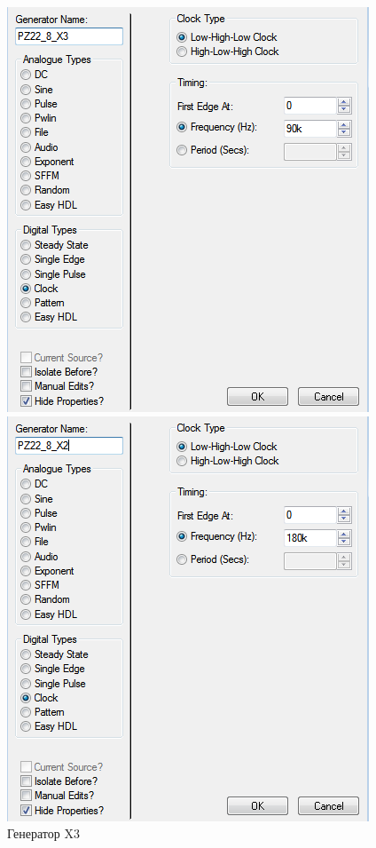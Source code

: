 \documentclass{article}
\begin{document}
\begin{normalsize}
\begin{figure}[H]
\begin{minipage}[h]{0.47\linewidth}
\begin{center}
				\includegraphics[width=1\linewidth]{g3} 
				\caption{Генератор  X3}
			\end{center}
		\end{minipage}
		\vfill
		\vspace{0.2 cm}
		\begin{minipage}[h]{0.47\linewidth}
			\begin{center}
				\includegraphics[width=1\linewidth]{g2} 

\end{center}
\end{minipage}
\end{figure}
\end{normalsize}
\end{document}
